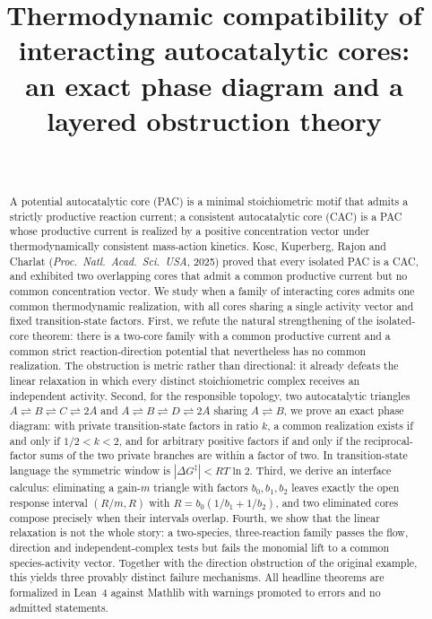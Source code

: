 \documentclass[11pt,a4paper]{article}
\title{Thermodynamic compatibility of interacting autocatalytic cores:\\ an exact phase diagram and a layered obstruction theory}
\author{\PaperAuthor\\ \PaperAffiliation}
\date{\PaperDate}
\theoremstyle{plain}
\theoremstyle{definition}
\theoremstyle{remark}
\newcommand{\rev}{\rightleftharpoons}
\begin{document}
\maketitle

\begin{abstract}
A potential autocatalytic core (PAC) is a minimal stoichiometric motif that admits a strictly productive reaction current; a consistent autocatalytic core (CAC) is a PAC whose productive current is realized by a positive concentration vector under thermodynamically consistent mass-action kinetics. Kosc, Kuperberg, Rajon and Charlat (\emph{Proc.\ Natl.\ Acad.\ Sci.\ USA}, 2025) proved that every isolated PAC is a CAC, and exhibited two overlapping cores that admit a common productive current but no common concentration vector. We study when a family of interacting cores admits one common thermodynamic realization, with all cores sharing a single activity vector and fixed transition-state factors. First, we refute the natural strengthening of the isolated-core theorem: there is a two-core family with a common productive current and a common strict reaction-direction potential that nevertheless has no common realization. The obstruction is metric rather than directional: it already defeats the linear relaxation in which every distinct stoichiometric complex receives an independent activity. Second, for the responsible topology, two autocatalytic triangles $A\rev B\rev C\rev 2A$ and $A\rev B\rev D\rev 2A$ sharing $A\rev B$, we prove an exact phase diagram: with private transition-state factors in ratio $k$, a common realization exists if and only if $1/2<k<2$, and for arbitrary positive factors if and only if the reciprocal-factor sums of the two private branches are within a factor of two. In transition-state language the symmetric window is $|\Delta G^{\ddagger}|<RT\ln 2$. Third, we derive an interface calculus: eliminating a gain-$m$ triangle with factors $b_0,b_1,b_2$ leaves exactly the open response interval $(R/m,R)$ with $R=b_0(1/b_1+1/b_2)$, and two eliminated cores compose precisely when their intervals overlap. Fourth, we show that the linear relaxation is not the whole story: a two-species, three-reaction family passes the flow, direction and independent-complex tests but fails the monomial lift to a common species-activity vector. Together with the direction obstruction of the original example, this yields three provably distinct failure mechanisms. All headline theorems are formalized in Lean~4 against Mathlib with warnings promoted to errors and no admitted statements.
\end{abstract}
\end{document}
